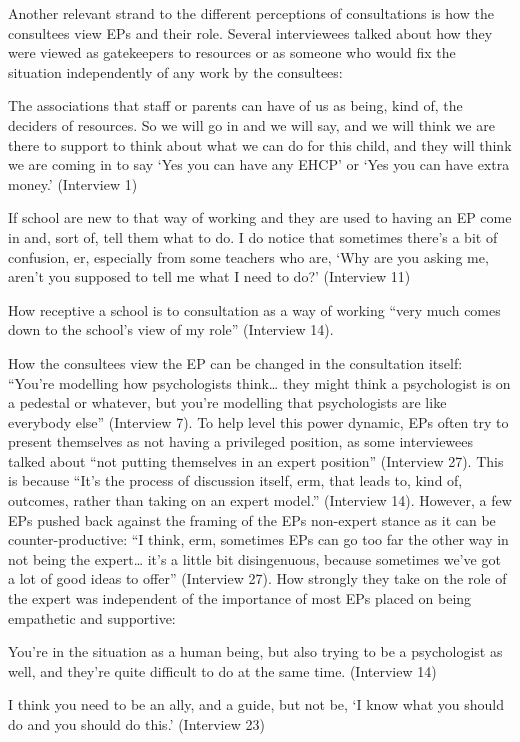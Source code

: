 \documentclass[
]{article}
\begin{document}
Another relevant strand to the different perceptions of consultations is
how the consultees view EPs and their role. Several interviewees talked
about how they were viewed as gatekeepers to resources or as someone who
would fix the situation independently of any work by the consultees:

The associations that staff or parents can have of us as being, kind of,
the deciders of resources. So we will go in and we will say, and we will
think we are there to support to think about what we can do for this
child, and they will think we are coming in to say `Yes you can have any
EHCP' or `Yes you can have extra money.' (Interview 1)

If school are new to that way of working and they are used to having an
EP come in and, sort of, tell them what to do. I do notice that
sometimes there's a bit of confusion, er, especially from some teachers
who are, `Why are you asking me, aren't you supposed to tell me what I
need to do?' (Interview 11)

How receptive a school is to consultation as a way of working ``very
much comes down to the school's view of my role'' (Interview 14).

How the consultees view the EP can be changed in the consultation
itself: ``You're modelling how psychologists think\ldots{} they might
think a psychologist is on a pedestal or whatever, but you're modelling
that psychologists are like everybody else'' (Interview 7). To help
level this power dynamic, EPs often try to present themselves as not
having a privileged position, as some interviewees talked about ``not
putting themselves in an expert position'' (Interview 27). This is
because ``It's the process of discussion itself, erm, that leads to,
kind of, outcomes, rather than taking on an expert model.'' (Interview
14). However, a few EPs pushed back against the framing of the EPs
non-expert stance as it can be counter-productive: ``I think, erm,
sometimes EPs can go too far the other way in not being the
expert\ldots{} it's a little bit disingenuous, because sometimes we've
got a lot of good ideas to offer'' (Interview 27). How strongly they
take on the role of the expert was independent of the importance of most
EPs placed on being empathetic and supportive:

You're in the situation as a human being, but also trying to be a
psychologist as well, and they're quite difficult to do at the same
time. (Interview 14)

I think you need to be an ally, and a guide, but not be, `I know what
you should do and you should do this.' (Interview 23)
\end{document}
